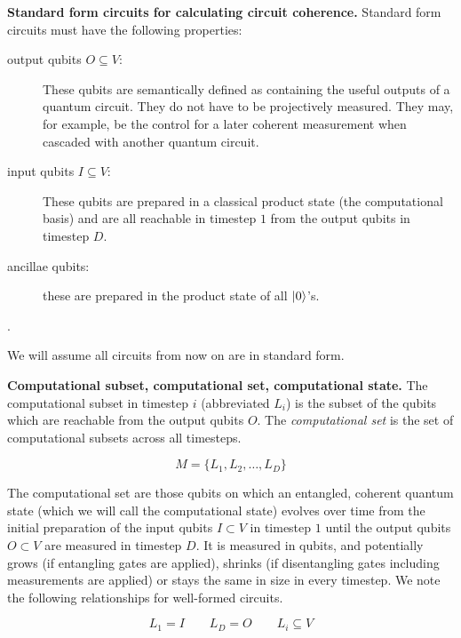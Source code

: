 \begin{definition}{\textbf{Standard form circuits for calculating circuit coherence.}}
Standard form circuits must have the following properties:

\begin{description}
\item[output qubits $O \subseteq V$:] These qubits are semantically defined as
containing the useful outputs of a quantum circuit. They do not have to be
projectively measured. They may, for example, be the control for a
later coherent measurement when cascaded with another quantum circuit.
\item[input qubits $I \subseteq V$:] These qubits are prepared in a 
classical product state (the computational basis)
and are all reachable in timestep $1$ from the
output qubits in timestep $D$.
\item[ancillae qubits:] these are prepared in the product state of all $\left\vert{0}\right\rangle$'s.
\end{description}
\end{definition}.

We will assume all circuits from now on are in standard form.

\begin{definition}{\textbf{Computational subset, computational set, computational state.}}
The computational subset in timestep $i$ (abbreviated $L_i$) is the subset of the qubits
which are reachable from the output qubits $O$.
The \emph{computational set} is the set of computational subsets across
all timesteps.

\begin{equation}
M = \{L_1, L_2, \ldots, L_D \}
\end{equation}
\end{definition}

The computational set are those qubits on which an entangled, coherent
quantum state (which we will call the computational state) evolves over time from
the initial preparation of the input qubits $I \subset V$ in timestep $1$
until the output qubits $O \subset V$ are
measured in timestep $D$.
It is measured in qubits, and potentially grows (if entangling gates are applied), shrinks
(if disentangling gates including measurements are applied) or stays the same in size
in every timestep. We note the following
relationships for well-formed circuits.

\begin{equation}
L_1 = I \qquad L_D = O \qquad L_i \subseteq V
\end{equation}

